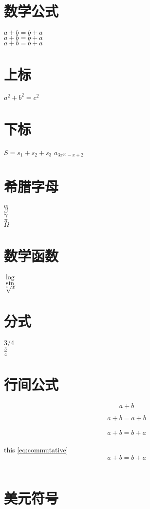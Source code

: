 \documentclass{article}
\begin{document}
    \section{数学公式}
        \begin{math}a+b=b+a\end{math} \\
        $a+b=b+a$ \\
        \(a+b=b+a\)
    \section{上标}
        $a^2+b^2=c^2$
    \section{下标}
        $S=s_1+s_2+s_3$
        $a_{3x^{20} - x + 2}$
    \section{希腊字母}
        $\alpha$\\
        $\beta$\\
        $\gamma$\\
        $\pi$\\
        $\Omega$ %
    \section{数学函数}
        $\log$ \\
        $\sin$ \\
        $\sqrt[4]{x}$\\

    \section{分式}
        $3/4$\\
        $\frac{3}{4}$
    \section{行间公式}
        $$a+b$$

        \[a+b = a+b\]\\

        \begin{displaymath}
            a+b = b+a
        \end{displaymath}\\

        this \ref{eq:commutative}
        \begin{equation} %
            a+b = b+a  \label{eq:commutative}
        \end{equation}\\

     
    \section{美元符号}
\end{document}
